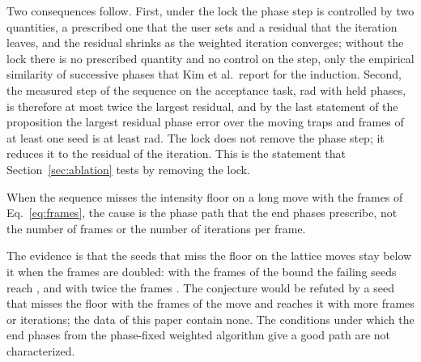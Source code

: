 Two consequences follow. First, under the lock the phase step is controlled by two quantities, a prescribed one that the user sets and a residual that the iteration leaves, and the residual shrinks as the weighted iteration converges; without the lock there is no prescribed quantity and no control on the step, only the empirical similarity of successive phases that Kim et al.\ report for the induction. Second, the measured step of the sequence on the acceptance task, \accBStepMax{} rad with held phases, is therefore at most twice the largest residual, and by the last statement of the proposition the largest residual phase error over the moving traps and frames of at least one seed is at least  rad. The lock does not remove the phase step; it reduces it to the residual of the iteration. This is the statement that Section~\ref{sec:ablation} tests by removing the lock.

\begin{conjecture}\label{conj:phasepath}
When the sequence misses the intensity floor on a long move with the frames of Eq.~\ref{eq:frames}, the cause is the phase path that the end phases prescribe, not the number of frames or the number of iterations per frame.
\end{conjecture}
The evidence is that the seeds that miss the floor on the lattice moves stay below it when the frames are doubled: with the frames of the bound the failing seeds reach \longFailList{}, and with twice the frames \longTwiceList{}. The conjecture would be refuted by a seed that misses the floor with the frames of the move and reaches it with more frames or iterations; the data of this paper contain none. The conditions under which the end phases from the phase-fixed weighted algorithm give a good path are not characterized.
